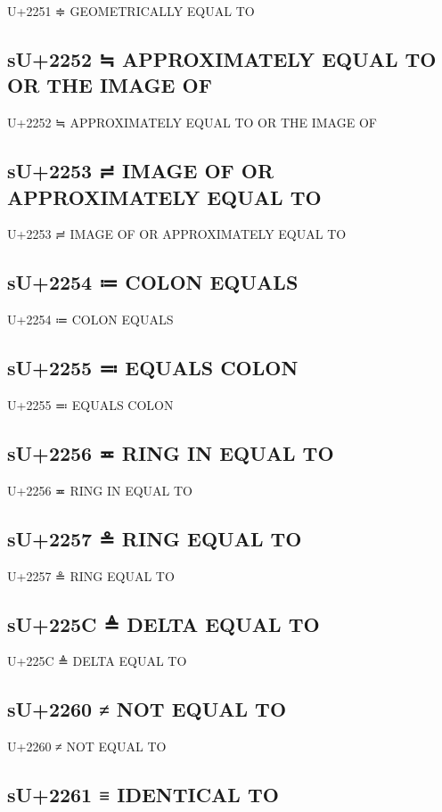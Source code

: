 U+2251 ≑ GEOMETRICALLY EQUAL TO

\subsection{sU+2252 ≒ APPROXIMATELY EQUAL TO OR THE IMAGE OF}

U+2252 ≒ APPROXIMATELY EQUAL TO OR THE IMAGE OF

\subsection{sU+2253 ≓ IMAGE OF OR APPROXIMATELY EQUAL TO}

U+2253 ≓ IMAGE OF OR APPROXIMATELY EQUAL TO

\subsection{sU+2254 ≔ COLON EQUALS}

U+2254 ≔ COLON EQUALS

\subsection{sU+2255 ≕ EQUALS COLON}

U+2255 ≕ EQUALS COLON

\subsection{sU+2256 ≖ RING IN EQUAL TO}

U+2256 ≖ RING IN EQUAL TO

\subsection{sU+2257 ≗ RING EQUAL TO}

U+2257 ≗ RING EQUAL TO

\subsection{sU+225C ≜ DELTA EQUAL TO}

U+225C ≜ DELTA EQUAL TO

\subsection{sU+2260 ≠ NOT EQUAL TO}

U+2260 ≠ NOT EQUAL TO

\subsection{sU+2261 ≡ IDENTICAL TO}

